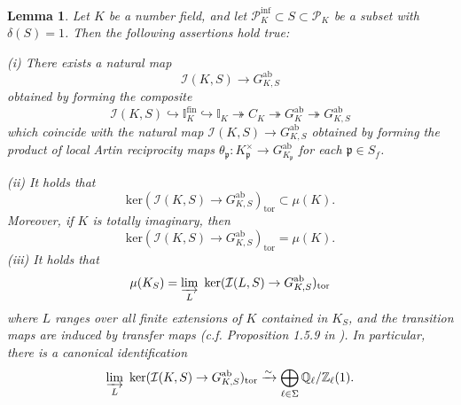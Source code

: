 \documentclass{article}
\theoremstyle{plain}
\newtheorem{lem}[thm]{Lemma}
\theoremstyle{definition}
\theoremstyle{remark}
\begin{document}
\begin{lem}
Let $K$ be a number field, and let $\mathscr{P}_K^{\text{inf}} \subset S \subset \mathscr{P}_K$ be a subset with $\delta(S) = 1$. Then the following assertions hold true: \par
(i) There exists a natural map
$$
\mathcal{I}(K,S) \to G_{K,S}^{\text{ab}}
$$
obtained by forming the composite
$$
\mathcal{I}(K,S) \hookrightarrow \mathbb I_K^{\text{fin}} \hookrightarrow \mathbb I_K \twoheadrightarrow C_K \twoheadrightarrow G_K^{\text{ab}} \twoheadrightarrow G_{K,S}^{\text{ab}}
$$
which coincide with the natural map $\mathcal{I}(K,S) \to G_{K,S}^{\text{ab}}$ obtained by forming the product of local Artin reciprocity maps $\theta_{\mathfrak{p}}: K_{\mathfrak{p}}^{\times} \to G_{K_{\mathfrak{p}}}^{\text{ab}}$ for each $\mathfrak{p} \in S_f$. \par
(ii) It holds that
$$
\text{ker}(\mathcal{I}(K,S)\to G_{K,S}^{\text{ab}})_{\text{tor}} \subset \mu(K).
$$
Moreover, if $K$ is totally imaginary, then
$$
\text{ker}(\mathcal{I}(K,S) \to G_{K,S}^{\text{ab}})_{\text{tor}} = \mu(K).
$$
(iii) It holds that
$$
\mu(K_S) = \varinjlim_L ~\text{ker}(\mathcal{I}(L,S) \to G_{K,S}^{\text{ab}})_{\text{tor}}
$$
where $L$ ranges over all finite extensions of $K$ contained in $K_S$, and the transition maps are induced by transfer maps (c.f. Proposition 1.5.9 in \cite{NSW}). In particular, there is a canonical identification
$$
\varinjlim_L~\text{ker}(\mathcal{I}(K,S) \to G_{K,S}^{\text{ab}})_{\text{tor}} \xrightarrow{\sim} \bigoplus_{\ell \in \Sigma} \mathbb{Q}_{\ell}/\mathbb{Z}_{\ell} (1).
$$
\end{lem}
\end{document}
